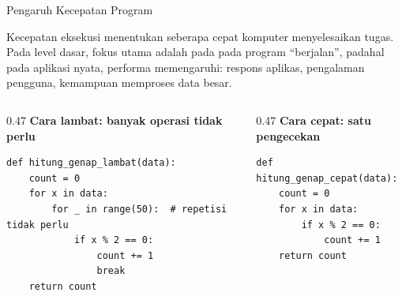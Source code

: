 \documentclass[aspectratio=169, table]{beamer}
\begin{document}
\begin{frame}[fragile]{Pengaruh Kecepatan Program}
\vspace{20pt}

Kecepatan eksekusi menentukan seberapa cepat komputer menyelesaikan tugas.
Pada level dasar, fokus utama adalah pada pada program “berjalan”, padahal
pada aplikasi nyata, performa memengaruhi: respons aplikas, pengalaman pengguna, kemampuan memproses data besar.

\begin{columns}[T]
\begin{column}{0.47\linewidth}
\textbf{Cara lambat: banyak operasi tidak perlu}

\begin{lstlisting}[style=PythonStyle, basicstyle=\ttfamily\scriptsize]
def hitung_genap_lambat(data):
    count = 0
    for x in data:
        for _ in range(50):  # repetisi tidak perlu
            if x % 2 == 0:
                count += 1
                break
    return count
\end{lstlisting}
\end{column}

\begin{column}{0.47\linewidth}
\textbf{Cara cepat: satu pengecekan}

\begin{lstlisting}[style=PythonStyle, basicstyle=\ttfamily\scriptsize]
def hitung_genap_cepat(data):
    count = 0
    for x in data:
        if x % 2 == 0:
            count += 1
    return count
\end{lstlisting}
\end{column}

\end{columns}

\end{frame}
\end{document}
